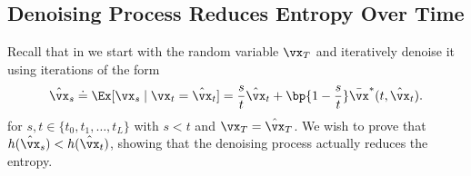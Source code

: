 \documentclass[../../book-main.tex]{subfiles}
\begin{document}
\subsection{Denoising Process Reduces Entropy Over
Time}\label{sub:denoising_entropy_decreases}

Recall that in  we start with the
random variable \(\vx_{T}\) and iteratively denoise it using
iterations of the form
\begin{equation}\label{eq:app_denoising_iteration}
    \hat{\vx}_{s} \doteq \Ex[\vx_{s} \mid \vx_{t} = \hat{\vx}_{t}] =
    \frac{s}{t}\hat{\vx}_{t} + \bp{1 -
    \frac{s}{t}}\bar{\vx}^{\ast}(t, \hat{\vx}_{t}).
\end{equation}
for \(s, t \in \{t_{0}, t_{1}, \dots, t_{L}\}\) with \(s < t\) and
\(\vx_{T} = \hat{\vx}_{T}\). We wish to prove that \(h(\hat{\vx}_{s})
< h(\hat{\vx}_{t})\), showing that the denoising process actually
reduces the entropy.
\end{document}
